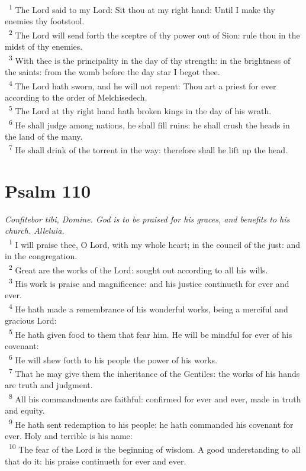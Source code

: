 \documentclass[a5paper,12pt]{article}
\begin{document}
\begin{multicols*}{2}
~\textsuperscript{1} The Lord said to my Lord: Sit thou at my right hand: Until I make thy enemies thy footstool.\\
~\textsuperscript{2} The Lord will send forth the sceptre of thy power out of Sion: rule thou in the midst of thy enemies.\\
~\textsuperscript{3} With thee is the principality in the day of thy strength: in the brightness of the saints: from the womb before the day star I begot thee.\\
~\textsuperscript{4} The Lord hath sworn, and he will not repent: Thou art a priest for ever according to the order of Melchisedech.\\
~\textsuperscript{5} The Lord at thy right hand hath broken kings in the day of his wrath.\\
~\textsuperscript{6} He shall judge among nations, he shall fill ruins: he shall crush the heads in the land of the many.\\
~\textsuperscript{7} He shall drink of the torrent in the way: therefore shall he lift up the head.\\

\section{Psalm 110}
\label{sec:org00fa4c8}
\emph{Confitebor tibi, Domine. God is to be praised for his graces, and benefits to his church. Alleluia.}\\

~\textsuperscript{1} I will praise thee, O Lord, with my whole heart; in the council of the just: and in the congregation.\\
~\textsuperscript{2} Great are the works of the Lord: sought out according to all his wills.\\
~\textsuperscript{3} His work is praise and magnificence: and his justice continueth for ever and ever.\\
~\textsuperscript{4} He hath made a remembrance of his wonderful works, being a merciful and gracious Lord:\\
~\textsuperscript{5} He hath given food to them that fear him. He will be mindful for ever of his covenant:\\
~\textsuperscript{6} He will shew forth to his people the power of his works.\\
~\textsuperscript{7} That he may give them the inheritance of the Gentiles: the works of his hands are truth and judgment.\\
~\textsuperscript{8} All his commandments are faithful: confirmed for ever and ever, made in truth and equity.\\
~\textsuperscript{9} He hath sent redemption to his people: he hath commanded his covenant for ever. Holy and terrible is his name:\\
~\textsuperscript{10} The fear of the Lord is the beginning of wisdom. A good understanding to all that do it: his praise continueth for ever and ever.\\


\end{multicols*}
\end{document}
